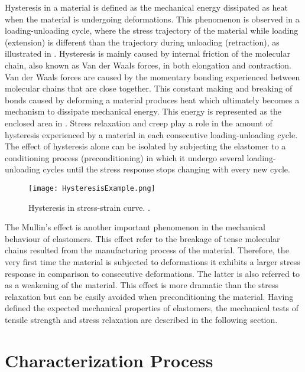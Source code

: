 Hysteresis in a material is defined as the mechanical energy dissipated as heat when the material is undergoing deformations. This phenomenon is observed in a loading-unloading cycle, where the stress trajectory of the material while loading (extension) is different than the trajectory during unloading (retraction), as illustrated in . Hysteresis is mainly caused by internal friction of the molecular chain, also known as Van der Waals forces, in both elongation and contraction. Van der Waals forces are caused by the momentary bonding experienced between molecular chains that are close together. This constant making and breaking of bonds caused by deforming a material produces heat which ultimately becomes a mechanism to dissipate mechanical energy. This energy is represented as the enclosed area in . Stress relaxation and creep play a role in the amount of hysteresis experienced by a material in each consecutive loading-unloading cycle. The effect of hysteresis alone can be isolated by subjecting the elastomer to a conditioning process (preconditioning) in which it undergo several loading-unloading cycles until the stress response stops changing with every new cycle.

\begin{figure}[htb!]
    \centering
    \texttt{[image: HysteresisExample.png]}
    \caption{Hysteresis in stress-strain curve. \cite{Bauman2008}.}
    \label{fig:hysteresis}
\end{figure}

The Mullin's effect is another important phenomenon in the mechanical behaviour of elastomers. This effect refer to the breakage of tense molecular chains resulted from the manufacturing process of the material. Therefore, the very first time the material is subjected to deformations it exhibits a larger stress response in comparison to consecutive deformations. The latter is also referred to as a weakening of the material. This effect is more dramatic than the stress relaxation but can be easily avoided when preconditioning the material. Having defined the expected mechanical properties of elastomers, the mechanical tests of tensile strength and stress relaxation are described in the following section.

\section{Characterization Process} \label{sec:CharacterizationProcess}

